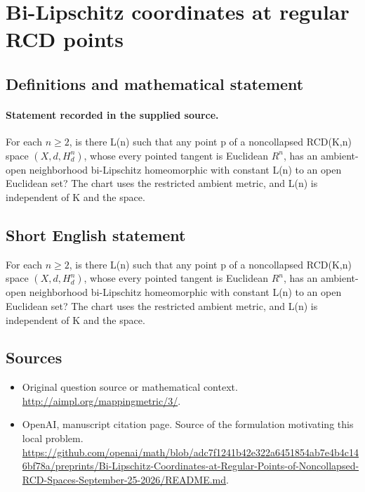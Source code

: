\documentclass[11pt]{article}
\begin{document}
\section*{Bi-Lipschitz coordinates at regular RCD points}\label{30007150}
\subsection{Definitions and mathematical statement}
\paragraph{Statement recorded in the supplied source.}
For each $n\geq 2$, is there L(n) such that any point p of a noncollapsed RCD(K,n) space $(X,d,H^{n}_d)$, whose every pointed tangent is Euclidean $R^{n}$, has an ambient-open neighborhood bi-Lipschitz homeomorphic with constant L(n) to an open Euclidean set? The chart uses the restricted ambient metric, and L(n) is independent of K and the space.
\subsection{Short English statement}
For each $n\geq 2$, is there L(n) such that any point p of a noncollapsed RCD(K,n) space $(X,d,H^{n}_d)$, whose every pointed tangent is Euclidean $R^{n}$, has an ambient-open neighborhood bi-Lipschitz homeomorphic with constant L(n) to an open Euclidean set? The chart uses the restricted ambient metric, and L(n) is independent of K and the space.
\subsection{Sources}
\begin{itemize}
\item[S1] Original question source or mathematical context.
\url{http://aimpl.org/mappingmetric/3/}.
\item[S2] OpenAI, manuscript citation page. Source of the formulation motivating this local problem.
\url{https://github.com/openai/math/blob/adc7f1241b42e322a6451854ab7e4b4c146bf78a/preprints/Bi-Lipschitz-Coordinates-at-Regular-Points-of-Noncollapsed-RCD-Spaces-September-25-2026/README.md}.
\end{itemize}
\end{document}
